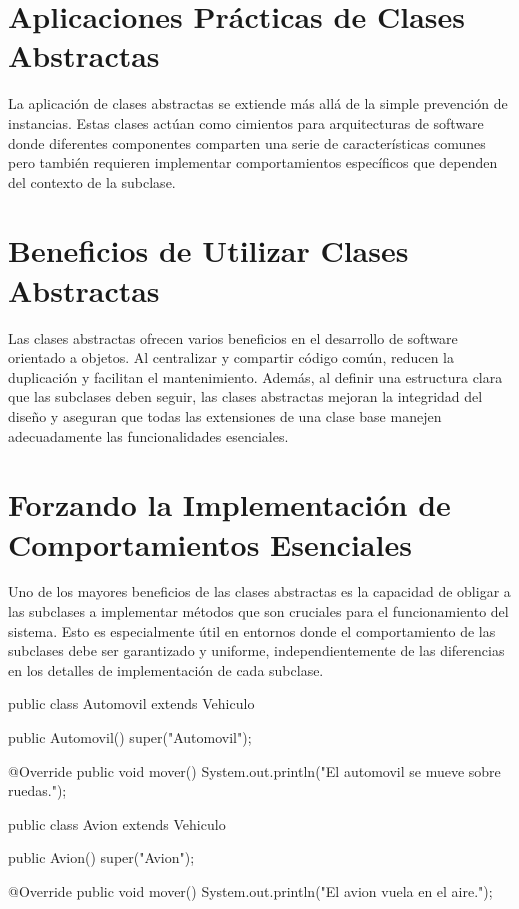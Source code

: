 \documentclass[a4paper]{report}
\begin{document}
\section{Aplicaciones Prácticas de Clases Abstractas}
La aplicación de clases abstractas se extiende más allá de la simple prevención de instancias. Estas clases actúan como cimientos para arquitecturas de software donde diferentes componentes comparten una serie de características comunes pero también requieren implementar comportamientos específicos que dependen del contexto de la subclase.

\section{Beneficios de Utilizar Clases Abstractas}
Las clases abstractas ofrecen varios beneficios en el desarrollo de software orientado a objetos. Al centralizar y compartir código común, reducen la duplicación y facilitan el mantenimiento. Además, al definir una estructura clara que las subclases deben seguir, las clases abstractas mejoran la integridad del diseño y aseguran que todas las extensiones de una clase base manejen adecuadamente las funcionalidades esenciales.

\section{Forzando la Implementación de Comportamientos Esenciales}
Uno de los mayores beneficios de las clases abstractas es la capacidad de obligar a las subclases a implementar métodos que son cruciales para el funcionamiento del sistema. Esto es especialmente útil en entornos donde el comportamiento de las subclases debe ser garantizado y uniforme, independientemente de las diferencias en los detalles de implementación de cada subclase.

\begin{roundedlst}
    public class Automovil extends Vehiculo {
        public Automovil() {
            super("Automovil");
        }

        @Override
        public void mover() {
            System.out.println("El automovil se 
                                mueve sobre ruedas.");
        }
    }

    public class Avion extends Vehiculo {
        public Avion() {
            super("Avion");
        }

        @Override
        public void mover() {
            System.out.println("El avion vuela 
                                en el aire.");
        }
    }
\end{roundedlst}
    
\end{document}
